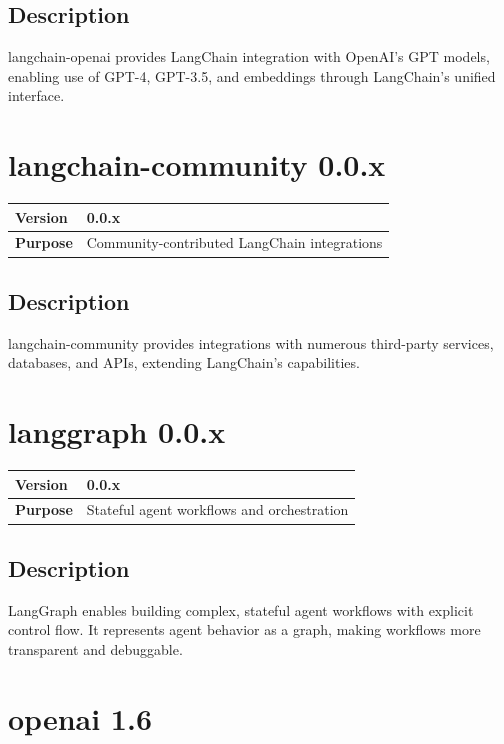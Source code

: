 \documentclass[12pt,a4paper]{report}
\begin{document}
\subsection{Description}

langchain-openai provides LangChain integration with OpenAI's GPT models, enabling use of GPT-4, GPT-3.5, and embeddings through LangChain's unified interface.

\section{langchain-community 0.0.x}

\begin{tabular}{|p{4cm}|p{10cm}|}
\hline
\textbf{Version} & 0.0.x \\
\hline
\textbf{Purpose} & Community-contributed LangChain integrations \\
\hline
\end{tabular}

\subsection{Description}

langchain-community provides integrations with numerous third-party services, databases, and APIs, extending LangChain's capabilities.

\section{langgraph 0.0.x}

\begin{tabular}{|p{4cm}|p{10cm}|}
\hline
\textbf{Version} & 0.0.x \\
\hline
\textbf{Purpose} & Stateful agent workflows and orchestration \\
\hline
\end{tabular}

\subsection{Description}

LangGraph enables building complex, stateful agent workflows with explicit control flow. It represents agent behavior as a graph, making workflows more transparent and debuggable.

\section{openai 1.6}
\end{document}
